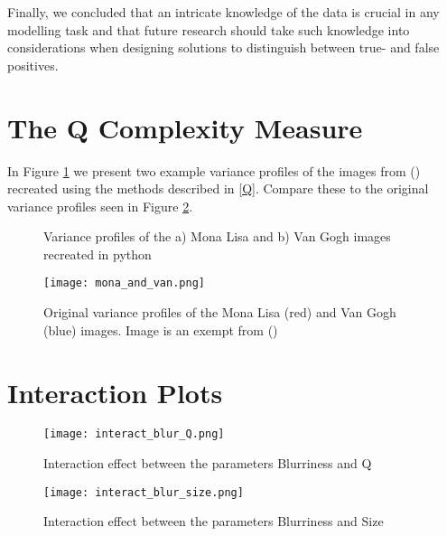\documentclass[12pt]{article}
\begin{document}
Finally, we concluded that an intricate knowledge of the data is crucial in any modelling task and that future research should take such knowledge into considerations when designing solutions to distinguish between true- and false positives.


\clearpage
\appto{\bibsetup}{\raggedright}
\printbibliography
\clearpage

\appendix
\section{The Q Complexity Measure}\label{AQ}
In Figure \ref{fig:Qrecreated} we present two example variance profiles of the images from (\cite{zanetteQuantifyingComplexityBlackandwhite2018}) recreated using the methods described in \ref{Q}. Compare these to the original variance profiles seen in Figure \ref{fig:monalisa}.

\begin{figure}[h]
	\centering
	\hfill
	\caption{Variance profiles of the a) Mona Lisa and b) Van Gogh images recreated in python} 
	\label{fig:Qrecreated}
\end{figure}

\begin{figure}[h]
	\begin{center}
		\texttt{[image: mona\_and\_van.png]}
	\end{center}
	\caption{Original variance profiles of the Mona Lisa (red) and Van Gogh (blue) images. Image is an exempt from (\cite{zanetteQuantifyingComplexityBlackandwhite2018})}
	\label{fig:monalisa}
\end{figure}

\clearpage
\section{Interaction Plots}\label{Ainteraction}

\begin{figure}[h]
	\begin{center}
		\texttt{[image: interact\_blur\_Q.png]}
	\end{center}
	\caption{Interaction effect between the parameters Blurriness and Q}
	\label{fig:interact_blur_Q}
\end{figure}

\begin{figure}[h]
	\begin{center}
		\texttt{[image: interact\_blur\_size.png]}
	\end{center}
	\caption{Interaction effect between the parameters Blurriness and Size}
	\label{fig:interact_blur_size}
\end{figure}
\end{document}
